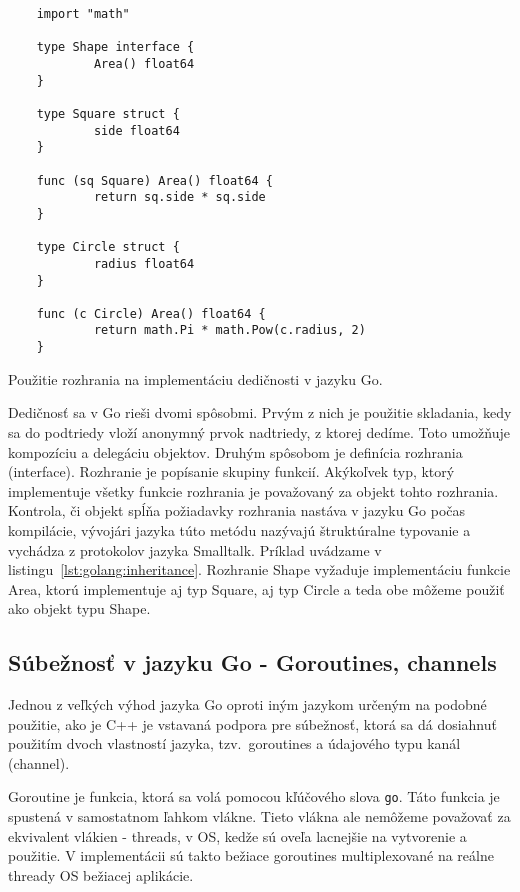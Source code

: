 \begin{listing}[h]
  \begin{verbatim}
    import "math"

    type Shape interface {
            Area() float64
    }

    type Square struct {
            side float64
    }

    func (sq Square) Area() float64 {
            return sq.side * sq.side
    }

    type Circle struct {
            radius float64
    }

    func (c Circle) Area() float64 {
            return math.Pi * math.Pow(c.radius, 2)
    }
  \end{verbatim}
  \caption{Použitie rozhrania na implementáciu dedičnosti v jazyku Go.}
  \label{lst:golang:inheritance}
\end{listing}

Dedičnosť sa v Go rieši dvomi spôsobmi. Prvým z nich je použitie skladania, kedy sa
do podtriedy vloží anonymný prvok nadtriedy, z ktorej dedíme. Toto umožňuje kompozíciu
a delegáciu objektov. Druhým spôsobom je definícia rozhrania (interface). Rozhranie je
popísanie skupiny funkcií. Akýkoľvek typ, ktorý implementuje všetky funkcie rozhrania
je považovaný za objekt tohto rozhrania. Kontrola, či objekt spĺňa
požiadavky rozhrania nastáva v jazyku Go počas kompilácie, vývojári jazyka túto
metódu nazývajú štruktúralne typovanie a vychádza z protokolov jazyka Smalltalk.\cite{GolangInterface}
Príklad uvádzame v listingu~\ref{lst:golang:inheritance}.
Rozhranie Shape vyžaduje implementáciu funkcie Area, ktorú implementuje aj typ Square,
aj typ Circle a teda obe môžeme použiť ako objekt typu Shape. 

\subsection{Súbežnosť v jazyku Go - Goroutines, channels}
\label{sec:golang:concurrency}

Jednou z veľkých výhod jazyka Go oproti iným jazykom určeným na podobné použitie,
ako je C++ je vstavaná podpora pre súbežnosť, ktorá sa dá dosiahnuť použitím
dvoch vlastností jazyka, tzv.\ goroutines a údajového typu kanál (channel).

Goroutine je funkcia, ktorá sa volá pomocou kľúčového slova \texttt{go}. Táto
funkcia je spustená v samostatnom ľahkom vlákne. Tieto vlákna ale nemôžeme považovať
za ekvivalent vlákien - threads, v OS, kedže sú oveľa lacnejšie na vytvorenie a použitie.
V implementácii sú takto bežiace goroutines multiplexované na reálne thready OS bežiacej
aplikácie.

